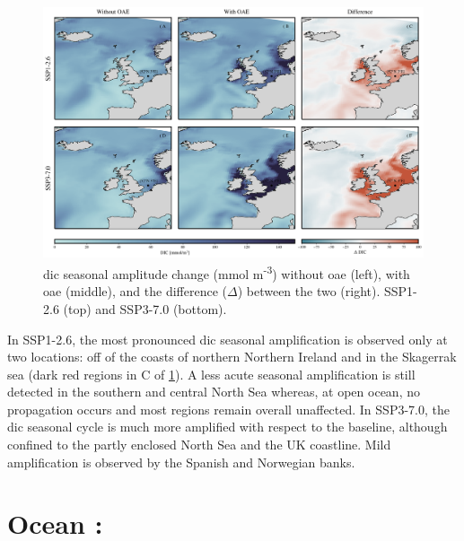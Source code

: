 \begin{figure}[H]
\caption[\texorpdfstring{DIC}{DIC} seasonal amplitude change]{\ac{dic} seasonal amplitude change (mmol m\textsuperscript{-3}) without \ac{oae} (left), with \ac{oae} (middle), and the difference ($\Delta$) between the two (right). SSP1-2.6 (top) and SSP3-7.0 (bottom).}
\label{dicamplitude}
\centering
\includegraphics[width=15cm]{fig/3_Results/DIC/dic_amplitude.png}

\end{figure}

In SSP1-2.6, the most pronounced \ac{dic} seasonal amplification is observed only at two locations: off of the coasts of northern Northern Ireland and in the Skagerrak sea (dark red regions in C of \cref{dicamplitude}). A less acute seasonal amplification is still detected in the southern and central North Sea whereas, at open ocean, no propagation occurs and most regions remain overall unaffected. In SSP3-7.0, the \ac{dic} seasonal cycle is much more amplified with respect to the baseline, although confined to the partly enclosed North Sea and the UK coastline. Mild amplification is observed by the Spanish and Norwegian banks. 

\section{Ocean :}

